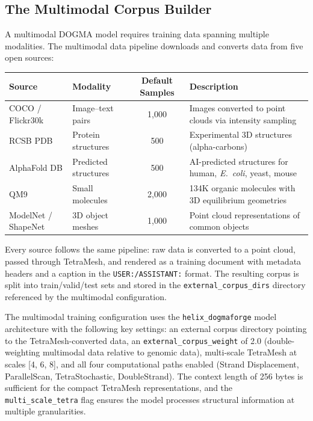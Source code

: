 \subsection{The Multimodal Corpus Builder}
\label{sec:multimodal-corpus}

A multimodal DOGMA model requires training data spanning multiple modalities. The multimodal data pipeline downloads and converts data from five open sources:

\begin{center}
\renewcommand{\arraystretch}{1.15}
\begin{tabularx}{0.92\textwidth}{l l c Y}
\toprule
\textbf{Source} & \textbf{Modality} & \textbf{Default Samples} & \textbf{Description} \\
\midrule
COCO / Flickr30k & Image--text pairs & 1,000 & Images converted to point clouds via intensity sampling \\
RCSB PDB & Protein structures & 500 & Experimental 3D structures (alpha-carbons) \\
AlphaFold DB & Predicted structures & 500 & AI-predicted structures for human, \emph{E.~coli}, yeast, mouse \\
QM9 & Small molecules & 2,000 & 134K organic molecules with 3D equilibrium geometries \\
ModelNet / ShapeNet & 3D object meshes & 1,000 & Point cloud representations of common objects \\
\bottomrule
\end{tabularx}
\end{center}

Every source follows the same pipeline: raw data is converted to a point cloud, passed through TetraMesh, and rendered as a training document with metadata headers and a caption in the \texttt{USER:/ASSISTANT:} format. The resulting corpus is split into train/valid/test sets and stored in the \texttt{external\_corpus\_dirs} directory referenced by the multimodal configuration.

\begin{implnote}
The multimodal training configuration uses the \texttt{helix\_dogmaforge} model architecture with the following key settings: an external corpus directory pointing to the TetraMesh-converted data, an \texttt{external\_corpus\_weight} of 2.0 (double-weighting multimodal data relative to genomic data), multi-scale TetraMesh at scales [4, 6, 8], and all four computational paths enabled (Strand Displacement, ParallelScan, TetraStochastic, DoubleStrand). The context length of 256 bytes is sufficient for the compact TetraMesh representations, and the \texttt{multi\_scale\_tetra} flag ensures the model processes structural information at multiple granularities.
\end{implnote}

